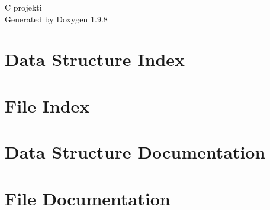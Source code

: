 \documentclass[twoside]{book}
\newcommand{\+}{\discretionary{\mbox{\scriptsize$\hookleftarrow$}}{}{}}
\newcommand{\clearemptydoublepage}{%
    \newpage{\pagestyle{empty}\cleardoublepage}%
  }
\begin{document}
  \raggedbottom
    \hypersetup{pageanchor=false,
                bookmarksnumbered=true,
                pdfencoding=unicode
               }
  \begin{titlepage}
  \vspace*{7cm}
  \begin{center}%
  {\Large C projekti}\\
  \vspace*{1cm}
  {\large Generated by Doxygen 1.9.8}\\
  \end{center}
  \end{titlepage}
  \clearemptydoublepage
  \tableofcontents
  \clearemptydoublepage
  \hypersetup{pageanchor=true}
\chapter{Data Structure Index}

\chapter{File Index}

\chapter{Data Structure Documentation}



\chapter{File Documentation}


















  \backmatter
  \newpage
  \clearemptydoublepage
  \printindex
\end{document}

